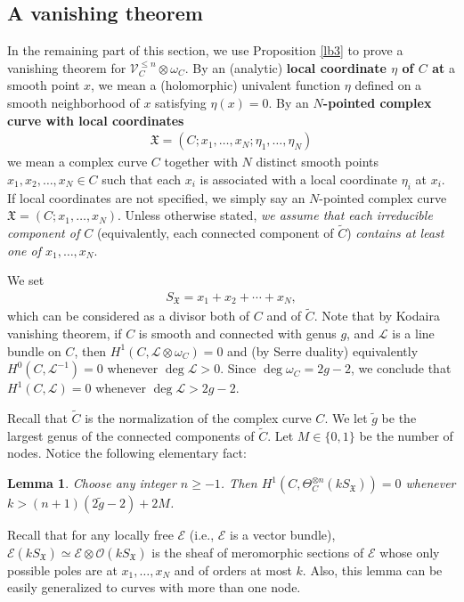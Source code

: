 \documentclass[12pt,a4paper,notitlepage]{article}
\theoremstyle{definition}
\theoremstyle{plain}
\newtheorem{lm}[df]{Lemma}
\newcommand{\fk}{\mathfrak}
\newcommand{\wtd}{\widetilde}
\newcommand{\scr}{\mathscr}
\newcommand{\SX}{S_{\fk X}}
\newcommand{\blt}{\bullet}
\numberwithin{equation}{section}
\begin{document}
\subsection*{A vanishing theorem}



In the remaining part of this section, we use Proposition \ref{lb3} to prove a vanishing theorem for $\scr V_C^{\leq n}\otimes\omega_C$. By an (analytic) \textbf{local coordinate $\eta$ of $C$ at} a smooth point $x$, we mean  a (holomorphic) univalent function $\eta$ defined on a smooth neighborhood of $x$ satisfying $\eta(x)=0$. By an \textbf{$N$-pointed complex curve with local coordinates}
\begin{align*}
\fk X=(C;x_1,\dots,x_N;\eta_1,\dots,\eta_N)
\end{align*}
we mean a complex curve $C$ together with $N$ distinct smooth points $x_1,x_2,\dots,x_N\in C$ such that each $x_i$ is associated with a local coordinate $\eta_i$ at $x_i$. If local coordinates are not specified, we simply say an $N$-pointed complex curve $\fk X=(C;x_1,\dots,x_N)$. Unless otherwise stated, \emph{we assume that each irreducible component of $C$} (equivalently, each connected component of $\wtd C$) \emph{contains at least one of $x_1,\dots,x_N$}. 

We set \index{SX@$\SX,\SX(b)$}
\begin{align*}
\SX=x_1+x_2+\cdots+x_N,
\end{align*}
which can be considered as a divisor both of $C$ and of $\wtd C$. Note that by Kodaira vanishing theorem, if $C$ is smooth and connected with genus $g$, and $\scr L$ is a line bundle on $C$, then $H^1(C,\scr L\otimes\omega_C)=0$ and (by Serre duality) equivalently  $H^0(C,\scr L^{-1})=0$ whenever $\deg\scr L>0$. Since $\deg\omega_C=2g-2$, we conclude that $H^1(C,\scr L)=0$ whenever $\deg\scr L>2g-2$.


Recall that $\wtd C$ is the normalization of the complex curve $C$. We let $\wtd g$ be the largest genus of the connected components of $\wtd C$. Let $M\in\{0,1\}$ be the number of nodes. Notice the following elementary fact:

\begin{lm}\label{lb4}
Choose any integer $n\geq -1$. Then $H^1(C,\Theta_C^{\otimes n}(k\SX))=0$ whenever  $k>(n+1)(2\wtd g-2)+2M$.
\end{lm} 

Recall that for any locally free $\scr E$ (i.e., $\scr E$ is a vector bundle), \index{SX@$k\SX,\blt\SX$} $\scr E(k\SX)\simeq\scr E\otimes\scr O(k\SX)$ is the sheaf of meromorphic sections of $\scr E$ whose only possible poles are at $x_1,\dots,x_N$ and of orders at most $k$. Also, this lemma can be easily generalized to curves with more than one node.
\end{document}
